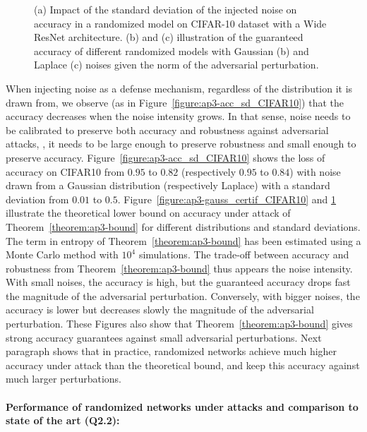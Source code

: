 \begin{figure}[htb]
\begin{subfigure}[t]{0.31\textwidth}
      \caption{}
      \label{figure:ap3-laplace_certif_CIFAR10}
  \end{subfigure}
  \caption{(a) Impact of the standard deviation of the injected noise on accuracy in a randomized model on CIFAR-10 dataset with a Wide ResNet architecture. (b) and (c) illustration of the guaranteed accuracy of different randomized models with Gaussian (b) and Laplace (c) noises given the norm of the adversarial perturbation.}
  \label{figure:ap3-cifar10_results}
\end{figure}

When injecting noise as a defense mechanism, regardless of the distribution it is drawn from, we observe (as in Figure~\ref{figure:ap3-acc_sd_CIFAR10}) that the accuracy decreases when the noise intensity grows.
In that sense, noise needs to be calibrated to preserve both accuracy and robustness against adversarial attacks, \ie, it needs to be large enough to preserve robustness and small enough to preserve accuracy.
Figure~\ref{figure:ap3-acc_sd_CIFAR10} shows the loss of accuracy on CIFAR10 from $0.95$ to $0.82$ (respectively $0.95$ to $0.84$) with noise drawn from a Gaussian distribution (respectively Laplace) with a standard deviation from $0.01$ to $0.5$.
Figure~\ref{figure:ap3-gauss_certif_CIFAR10} and \ref{figure:ap3-laplace_certif_CIFAR10} illustrate the theoretical lower bound on accuracy under attack of Theorem~\ref{theorem:ap3-bound} for different distributions and standard deviations.
The term in entropy of Theorem~\ref{theorem:ap3-bound} has been estimated using a Monte Carlo method with $10^4$ simulations.
The trade-off between accuracy and robustness from Theorem~\ref{theorem:ap3-bound} thus appears \wrt the noise intensity.
With small noises, the accuracy is high, but the guaranteed accuracy drops fast \wrt the magnitude of the adversarial perturbation.
Conversely, with bigger noises, the accuracy is lower but decreases slowly \wrt the magnitude of the adversarial perturbation.
These Figures also show that Theorem~\ref{theorem:ap3-bound} gives strong accuracy guarantees against small adversarial perturbations.
Next paragraph shows that in practice, randomized networks achieve much higher accuracy under attack than the theoretical bound, and keep this accuracy against much larger perturbations.


\paragraph{Performance of randomized networks under attacks and comparison to state of the art (Q2.2):}
\label{sec:perf_under_attack}

